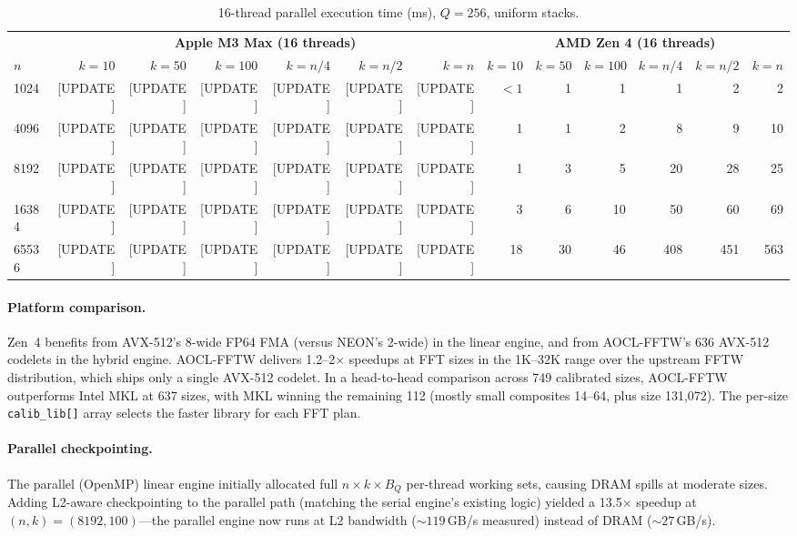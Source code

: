 \documentclass[11pt]{article}
\begin{document}
\begin{table}[t]
\centering
\caption{16-thread parallel execution time (ms), $Q = 256$, uniform stacks.}
\label{tab:parallel}
\begin{tabular}{@{}l rrrrrr rrrrrr@{}}
\toprule
& \multicolumn{6}{c}{\textbf{Apple M3 Max (16 threads)}} &
  \multicolumn{6}{c}{\textbf{AMD Zen 4 (16 threads)}} \\
\cmidrule(lr){2-7} \cmidrule(lr){8-13}
$n$ & $k{=}10$ & $k{=}50$ & $k{=}100$ & $k{=}n/4$ & $k{=}n/2$ & $k{=}n$
    & $k{=}10$ & $k{=}50$ & $k{=}100$ & $k{=}n/4$ & $k{=}n/2$ & $k{=}n$ \\
\midrule
1024  & [UPDATE] & [UPDATE] & [UPDATE] & [UPDATE] & [UPDATE] & [UPDATE]
      & ${<}1$ & 1 & 1 & 1 & 2 & 2 \\
4096  & [UPDATE] & [UPDATE] & [UPDATE] & [UPDATE] & [UPDATE] & [UPDATE]
      & 1 & 1 & 2 & 8 & 9 & 10 \\
8192  & [UPDATE] & [UPDATE] & [UPDATE] & [UPDATE] & [UPDATE] & [UPDATE]
      & 1 & 3 & 5 & 20 & 28 & 25 \\
16384 & [UPDATE] & [UPDATE] & [UPDATE] & [UPDATE] & [UPDATE] & [UPDATE]
      & 3 & 6 & 10 & 50 & 60 & 69 \\
65536 & [UPDATE] & [UPDATE] & [UPDATE] & [UPDATE] & [UPDATE] & [UPDATE]
      & 18 & 30 & 46 & 408 & 451 & 563 \\
\bottomrule
\end{tabular}
\end{table}

\paragraph{Platform comparison.}
Zen~4 benefits from AVX-512's 8-wide FP64 FMA (versus NEON's 2-wide) in
the linear engine, and from AOCL-FFTW's 636 AVX-512 codelets in the
hybrid engine. AOCL-FFTW delivers 1.2--2$\times$ speedups at FFT sizes
in the 1K--32K range over the upstream FFTW distribution, which ships only
a single AVX-512 codelet. In a head-to-head comparison across 749 calibrated
sizes, AOCL-FFTW outperforms Intel MKL at 637 sizes, with MKL winning the
remaining 112 (mostly small composites 14--64, plus size 131{,}072).
The per-size \texttt{calib\_lib[]} array selects the faster library for
each FFT plan.

\paragraph{Parallel checkpointing.}
The parallel (OpenMP) linear engine initially allocated full
$n \times k \times B_Q$ per-thread working sets, causing DRAM spills at
moderate sizes. Adding L2-aware checkpointing to the parallel path
(matching the serial engine's existing logic) yielded a 13.5$\times$
speedup at $(n, k) = (8192, 100)$---the parallel engine now runs at
L2 bandwidth (${\sim}119$\,GB/s measured) instead of DRAM
(${\sim}27$\,GB/s).
\end{document}
